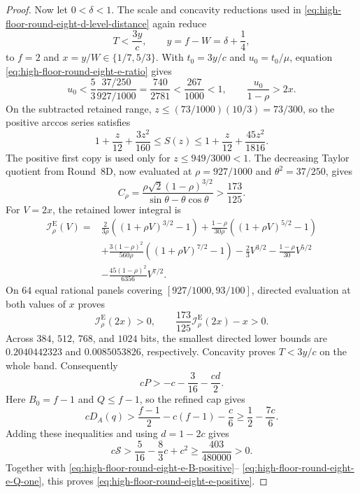\documentclass[11pt]{article}
\theoremstyle{remark}
\begin{document}
\begin{proof}
Now let $0<\delta<1$.  The scale and concavity reductions used in
\eqref{eq:high-floor-round-eight-d-level-distance} again reduce
\[
 T<\frac{3y}{c},\qquad y=f-W=\delta+\frac14,
\]
to $f=2$ and $x=y/W\in\{1/7,5/3\}$.  With
$t_0=3y/c$ and $u_0=t_0/\mu$, equation
\eqref{eq:high-floor-round-eight-e-ratio} gives
\[
 u_0<\frac53\frac{37/250}{927/1000}
 =\frac{740}{2781}<\frac{267}{1000}<1,\qquad
 \frac{u_0}{1-\rho}>2x.
\]
On the subtracted retained range,
$z\leq(73/1000)(10/3)=73/300$, so the positive arccos series satisfies
\begin{equation}
 1+\frac z{12}+\frac{3z^2}{160}
 \leq S(z)\leq
 1+\frac z{12}+\frac{45z^2}{1816}.
 \label{eq:high-floor-round-eight-e-series}
\end{equation}
The positive first copy is used only for $z\leq949/3000<1$.
The decreasing Taylor quotient from Round~8D, now evaluated at
$\rho=927/1000$ and $\theta^2=37/250$, gives
\[
 C_\rho=
 \frac{\rho\sqrt2(1-\rho)^{3/2}}
 {\sin\theta-\theta\cos\theta}>
 \frac{173}{125}.
\]
For $V=2x$, the retained lower integral is
\begin{equation}
\begin{aligned}
 \mathcal I^{\mathrm E}_\rho(V)
={}&\frac{2}{3\rho}
 \left((1+\rho V)^{3/2}-1\right)
 +\frac{1-\rho}{30\rho}
 \left((1+\rho V)^{5/2}-1\right)\\
&+\frac{3(1-\rho)^2}{560\rho}
 \left((1+\rho V)^{7/2}-1\right)
 -\frac23V^{3/2}-\frac{1-\rho}{30}V^{5/2}\\
&-\frac{45(1-\rho)^2}{6356}V^{7/2}.
\end{aligned}
 \label{eq:high-floor-round-eight-e-integral}
\end{equation}
On $64$ equal rational panels covering
$[927/1000,93/100]$, directed evaluation at both values of $x$ proves
\[
 \mathcal I^{\mathrm E}_\rho(2x)>0,\qquad
 \frac{173}{125}\mathcal I^{\mathrm E}_\rho(2x)-x>0.
\]
Across $384$, $512$, $768$, and $1024$ bits, the smallest directed
lower bounds are $0.2040442323$ and $0.0085053826$, respectively.
Concavity proves $T<3y/c$ on the whole band.  Consequently
\[
 cP>-c-\frac3{16}-\frac{cd}{2}.
\]
Here $B_0=f-1$ and $Q\leq f-1$, so the refined cap gives
\[
 cD_A(q)>
 \frac{f-1}{2}-c(f-1)-\frac c6
 \geq\frac12-\frac{7c}{6}.
\]
Adding these inequalities and using $d=1-2c$ gives
\begin{equation}
 c\mathcal S>
 \frac5{16}-\frac83c+c^2
 \geq\frac{403}{480000}>0.
 \label{eq:high-floor-round-eight-e-small-delta}
\end{equation}
Together with
\eqref{eq:high-floor-round-eight-e-B-positive}--%
\eqref{eq:high-floor-round-eight-e-Q-one}, this proves
\eqref{eq:high-floor-round-eight-e-positive}.


\end{proof}
\end{document}

